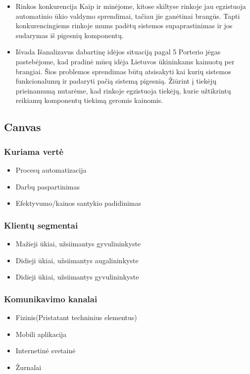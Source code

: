 \documentclass[oneside]{VUMIFPSkursinis}
\begin{document}
\begin{itemize}
		\item{Rinkos konkurencija}
Kaip ir minėjome, kitose skiltyse rinkoje jau egzistuoja automatinio ūkio valdymo sprendimai, tačiau jie ganėtinai brangūs. Tapti konkurencingiems rinkoje mums padėtų sistemos supaprastinimas ir jos sudarymas iš pigesnių komponentų.
		\item{Išvada} Išanalizavus dabartinę idėjos situaciją pagal 5 Porterio jėgas pastebėjome, kad pradinė mūsų idėja Lietuvos ūkininkams kainuotų per brangiai. Šios problemos sprendimas būtų atsisakyti kai kurių sistemos funkcionalumų ir padaryti pačią sistemą pigesnią. Žiūrint į tiekėjų prieinamumą nutarėme, kad  rinkoje egzistuoja tiekėjų, kurie užtikrintų reikiamų komponentų tiekimą geromis kainomis.

	\end{itemize}
	\subsection{Canvas}
	\subsubsection{Kuriama vertė}
	\begin{itemize}
		\item Procesų automatizacija
		\item Darbų paspartinimas
		\item Efektyvumo/kainos santykio padidinimas
	\end{itemize}
	\subsubsection{Klientų segmentai}
	\begin{itemize}
	\item Mažieji ūkiai, užsiimantys gyvulininkyste
	\item Didieji ūkiai, užsiimantys augalininkyste
	\item Didieji ūkiai, užsiimantys gyvulininkyste
	\end{itemize}
	\subsubsection{Komunikavimo kanalai}
	\begin{itemize}
	\item Fizinis(Pristatant techninius elementus)
	\item Mobili aplikacija
	\item Internetinė svetainė
	\item Žurnalai
	\end{itemize}
\end{document}
